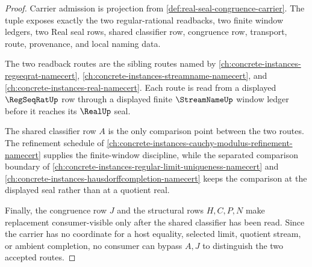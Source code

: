 \begin{proof}
Carrier admission is projection from \autoref{def:real-seal-congruence-carrier}. The tuple exposes exactly the two regular-rational readbacks, two finite window ledgers, two Real seal rows, shared classifier row, congruence row, transport, route, provenance, and local naming data.

The two readback routes are the sibling routes named by \autoref{ch:concrete-instances-regseqrat-namecert}, \autoref{ch:concrete-instances-streamname-namecert}, and \autoref{ch:concrete-instances-real-namecert}. Each route is read from a displayed $\RegSeqRatUp$ row through a displayed finite $\StreamNameUp$ window ledger before it reaches its $\RealUp$ seal.

The shared classifier row $A$ is the only comparison point between the two routes. The refinement schedule of \autoref{ch:concrete-instances-cauchy-modulus-refinement-namecert} supplies the finite-window discipline, while the separated comparison boundary of \autoref{ch:concrete-instances-regular-limit-uniqueness-namecert} and \autoref{ch:concrete-instances-hausdorffcompletion-namecert} keeps the comparison at the displayed seal rather than at a quotient real.

Finally, the congruence row $J$ and the structural rows $H,C,P,N$ make replacement consumer-visible only after the shared classifier has been read. Since the carrier has no coordinate for a host equality, selected limit, quotient stream, or ambient completion, no consumer can bypass $A,J$ to distinguish the two accepted routes.
\end{proof}

